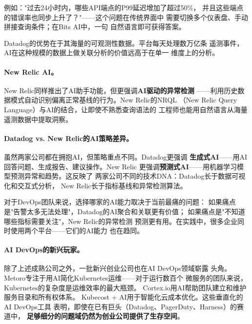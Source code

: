 例如："过去24小时内，哪些API端点的P99延迟增加了超过50\%，
并且这些端点的错误率也同步上升了？"——这个问题在传统界面中
需要切换多个仪表盘、手动拼接查询条件；在Bits AI中，一句
自然语言即可获得答案。

Datadog的优势在于其海量的可观测性数据。平台每天处理数万亿条
遥测事件，AI在这种规模的数据上做关联分析的价值远高于在单一
维度上的分析。

\paragraph{New Relic AI。}
New Relic同样推出了AI助手功能，但更强调\textbf{AI驱动的异常检测}
——利用历史数据模式自动识别偏离正常基线的行为。New Relic的NRQL
（New Relic Query Language）与AI的结合，让即使不熟悉查询语法的
工程师也能用自然语言从海量遥测数据中提取洞察。

\paragraph{Datadog vs. New Relic的AI策略差异。}
虽然两家公司都在拥抱AI，但策略重点不同。Datadog更强调
\textbf{生成式AI}——用AI回答问题、生成报告、建议操作。New Relic
更强调\textbf{预测式AI}——用机器学习模型预测异常和趋势。这反映了
两家公司不同的技术DNA：Datadog长于数据可视化和交互式分析，
New Relic长于指标基线和异常检测算法。

对于DevOps团队来说，选择哪家的AI能力取决于当前最痛的问题：
如果痛点是"告警太多无法处理"，Datadog的AI聚合和关联更有价值；
如果痛点是"不知道哪些指标需要关注"，New Relic的异常检测
预测更有用。在实践中，很多企业同时使用两个平台——它们的AI能力
也在趋同。

\paragraph{AI DevOps的新兴玩家。}
除了上述成熟公司之外，一批新兴创业公司也在AI DevOps领域崭露
头角。Metoro专注于用AI简化Kubernetes运维——对于运行数百个
微服务的团队来说，Kubernetes的复杂度是运维效率的最大瓶颈。
Cortex.io用AI帮助团队建立和维护服务目录和所有权体系。
Kubecost + AI用于智能化云成本优化。这些垂直化的AI DevOps工具
表明，即使在已有巨头（Datadog、PagerDuty、Harness）的赛道中，
\textbf{足够细分的问题域仍然为创业公司提供了生存空间}。

